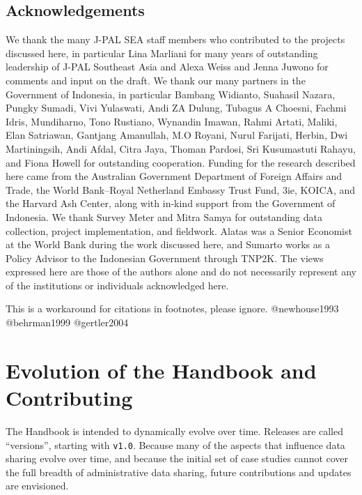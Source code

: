 \documentclass[
]{WileySix}
\begin{document}
\hypertarget{acknowledgements-4}{%
\subsection*{Acknowledgements}\label{acknowledgements-4}}

We thank the many J-PAL SEA staff members who contributed to the projects discussed here, in particular Lina Marliani for many years of outstanding leadership of J-PAL Southeast Asia and Alexa Weiss and Jenna Juwono for comments and input on the draft. We thank our many partners in the Government of Indonesia, in particular Bambang Widianto, Suahasil Nazara, Pungky Sumadi, Vivi Yulaswati, Andi ZA Dulung, Tubagus A Choesni, Fachmi Idris, Mundiharno, Tono Rustiano, Wynandin Imawan, Rahmi Artati, Maliki, Elan Satriawan, Gantjang Amanullah, M.O Royani, Nurul Farijati, Herbin, Dwi Martiningsih, Andi Afdal, Citra Jaya, Thoman Pardosi, Sri Kusumastuti Rahayu, and Fiona Howell for outstanding cooperation. Funding for the research described here came from the Australian Government Department of Foreign Affairs and Trade, the World Bank--Royal Netherland Embassy Trust Fund, 3ie, KOICA, and the Harvard Ash Center, along with in-kind support from the Government of Indonesia. We thank Survey Meter and Mitra Samya for outstanding data collection, project implementation, and fieldwork. Alatas was a Senior Economist at the World Bank during the work discussed here, and Sumarto works as a Policy Advisor to the Indonesian Government through TNP2K. The views expressed here are those of the authors alone and do not necessarily represent any of the institutions or individuals acknowledged here.

\begin{invisible}
This is a workaround for citations in footnotes, please ignore.
@newhouse1993 @behrman1999 @gertler2004
\end{invisible}

\hypertarget{appendix-appendix}{%
\appendix}


\hypertarget{contributing}{%
\section*{Evolution of the Handbook and Contributing}\label{contributing}}

The Handbook is intended to dynamically evolve over time. Releases are called ``versions'', starting with \texttt{v1.0}. Because many of the aspects that influence data sharing evolve over time, and because the initial set of case studies cannot cover the full breadth of administrative data sharing, future contributions and updates are envisioned.
\end{document}
